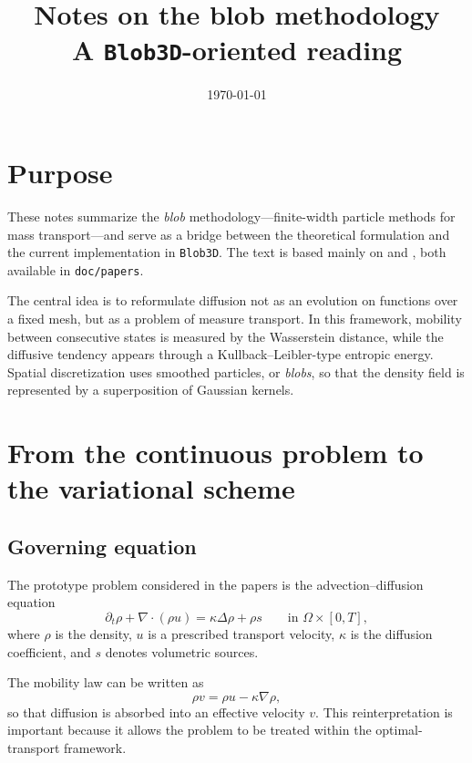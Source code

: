 \documentclass[11pt,a4paper]{article}
\title{Notes on the blob methodology\\[0.3em]\large A \texttt{Blob3D}-oriented reading}
\author{}
\date{\today}
\begin{document}
\maketitle

\section{Purpose}
These notes summarize the \emph{blob} methodology---finite-width particle methods for mass transport---and serve as a bridge between the theoretical formulation and the current implementation in \texttt{Blob3D}. The text is based mainly on \citet{pandolfi2023} and \citet{pandolfi2025}, both available in \texttt{doc/papers}.

The central idea is to reformulate diffusion not as an evolution on functions over a fixed mesh, but as a problem of measure transport. In this framework, mobility between consecutive states is measured by the Wasserstein distance, while the diffusive tendency appears through a Kullback--Leibler-type entropic energy. Spatial discretization uses smoothed particles, or \emph{blobs}, so that the density field is represented by a superposition of Gaussian kernels.

\section{From the continuous problem to the variational scheme}
\subsection{Governing equation}
The prototype problem considered in the papers is the advection--diffusion equation
\begin{equation}
\partial_t \rho + \nabla \cdot (\rho u) = \kappa \Delta \rho + \rho s
\qquad \text{in } \Omega \times [0,T],
\end{equation}
where $\rho$ is the density, $u$ is a prescribed transport velocity, $\kappa$ is the diffusion coefficient, and $s$ denotes volumetric sources.

The mobility law can be written as
\begin{equation}
\rho v = \rho u - \kappa \nabla \rho,
\end{equation}
so that diffusion is absorbed into an effective velocity $v$. This reinterpretation is important because it allows the problem to be treated within the optimal-transport framework.
\end{document}
